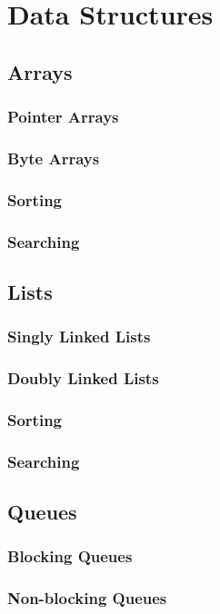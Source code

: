 \chapter{Data Structures}

\section{Arrays}
\subsection{Pointer Arrays}
\subsection{Byte Arrays}
\subsection{Sorting}
\subsection{Searching}

\section{Lists}
\subsection{Singly Linked Lists}
\subsection{Doubly Linked Lists}
\subsection{Sorting}
\subsection{Searching}

\section{Queues}
\subsection{Blocking Queues}
\subsection{Non-blocking Queues}

